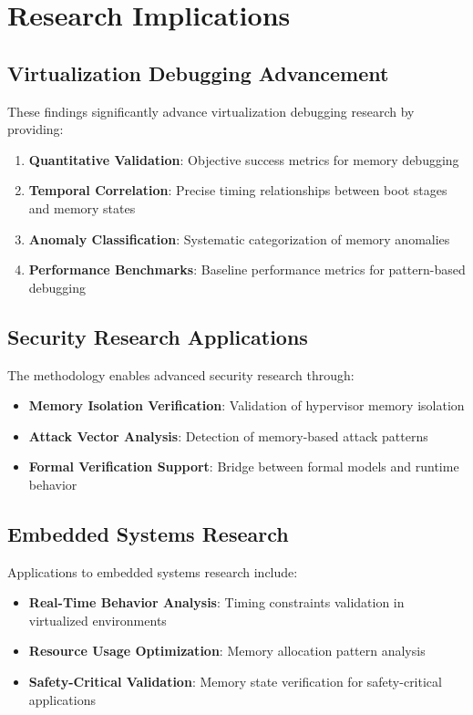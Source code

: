 \documentclass[11pt,a4paper]{article}
\begin{document}
\section{Research Implications}

\subsection{Virtualization Debugging Advancement}

These findings significantly advance virtualization debugging research by providing:

\begin{enumerate}
    \item \textbf{Quantitative Validation}: Objective success metrics for memory debugging
    \item \textbf{Temporal Correlation}: Precise timing relationships between boot stages and memory states
    \item \textbf{Anomaly Classification}: Systematic categorization of memory anomalies
    \item \textbf{Performance Benchmarks}: Baseline performance metrics for pattern-based debugging
\end{enumerate}

\subsection{Security Research Applications}

The methodology enables advanced security research through:

\begin{itemize}
    \item \textbf{Memory Isolation Verification}: Validation of hypervisor memory isolation
    \item \textbf{Attack Vector Analysis}: Detection of memory-based attack patterns
    \item \textbf{Formal Verification Support}: Bridge between formal models and runtime behavior
\end{itemize}

\subsection{Embedded Systems Research}

Applications to embedded systems research include:

\begin{itemize}
    \item \textbf{Real-Time Behavior Analysis}: Timing constraints validation in virtualized environments
    \item \textbf{Resource Usage Optimization}: Memory allocation pattern analysis
    \item \textbf{Safety-Critical Validation}: Memory state verification for safety-critical applications
\end{itemize}
\end{document}
